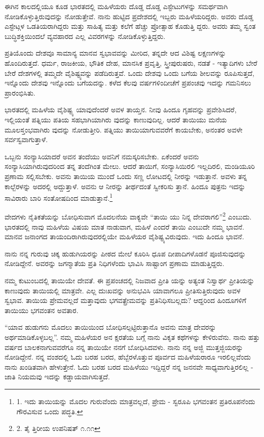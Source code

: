 ಈಗಿನ ಕಾಲದಲ್ಲಿಯೂ ಕೂಡ ಭಾರತದಲ್ಲಿ ಮಹಿಳೆಯರು ದೊಡ್ಡ ದೊಡ್ಡ ಎಸ್ಟೇಟುಗಳನ್ನು ಸಮರ್ಥವಾಗಿ ನೋಡಿಕೊಳ್ಳುತ್ತಿರುವುದನ್ನು ನೋಡುತ್ತೇವೆ. ನಾನು ಹುಟ್ಟಿದ ಪ್ರದೇಶದಲ್ಲಿ ಇಬ್ಬರು ಮಹಿಳೆಯರಿದ್ದರು. ಅವರು ದೊಡ್ಡ ಎಸ್ಟೇಟ್ಗಳ ಒಡತಿಯರಾಗಿದ್ದರು ಮತ್ತು ಸಾಹಿತ್ಯ ಮತ್ತು ಕಲೆಗೆ ಹೆಚ್ಚು ಪ್ರೋತ್ಸಾಹ ಕೊಡುತ್ತಿ ದ್ದರು. ಅವರು ತಮ್ಮ ಸ್ವಂತ ಬುದ್ಧಿಶಕ್ತಿಯಿಂದಲೆ ವ್ಯವಹಾರದ ಎಲ್ಲ ವಿವರಗಳನ್ನು ನೋಡಿಕೊಳ್ಳುತ್ತಿದ್ದರು.

ಪ್ರತಿಯೊಂದು ದೇಶವೂ ಸಾಮಾನ್ಯ ಮಾನವ ಸ್ವಭಾವವನ್ನು ಮೀರಿದ, ತನ್ನದೇ ಆದ ವಿಶಿಷ್ಟ ಲಕ್ಷಣಗಳನ್ನು ಹೊಂದಿರುತ್ತದೆ. ಧರ್ಮ, ರಾಜಕೀಯ, ಭೌತಿಕ ದೇಹ, ಮಾನಸಿಕ ಪ್ರವೃತ್ತಿ, ಸ್ತ್ರೀಪುರುಷರು, ನಡತೆ - ಇತ್ಯಾದಿಗಳು ಬೇರೆ ಬೇರೆ ದೇಶಗಳಲ್ಲಿ ತಮ್ಮದೇ ವೈಶಿಷ್ಟ್ಯವನ್ನು ಪಡೆದಿರುತ್ತವೆ. ಒಂದು ದೇಶವು ಒಂದು ಬಗೆಯ ಶೀಲವನ್ನು ರೂಪಿಸುತ್ತದೆ, ಇನ್ನೊಂದು ದೇಶವು ಇನ್ನೊಂದು ಬಗೆಯದನ್ನು. ಕಳೆದ ಕೆಲವು ವರ್ಷಗಳಿಂದೀಚೆಗೆ ಪ್ರಪಂಚವು ಇದನ್ನು ಗಮನಿಸಲು ಪ್ರಾರಂಭಿಸಿತು.

ಭಾರತದಲ್ಲಿ ಮಹಿಳೆಯ ವೈಶಿಷ್ಟ್ಯ ಯಾವುದೆಂದರೆ ಅವಳ ತಾಯ್ತನ. ನೀವು ಹಿಂದೂ ಗೃಹವನ್ನು ಪ್ರವೇಶಿಸಿದರೆ, ಇಲ್ಲಿಯಂತೆ ಪತ್ನಿಯು ಪತಿಯ ಸಹಭಾಗಿಯಾಗಿರು ವುದನ್ನು ಕಾಣುವುದಿಲ್ಲ. ಆದರೆ ತಾಯಿಯು ಮನೆಯ ಮೂಲಸ್ತಂಭವಾಗಿರು ವುದನ್ನು ನೋಡುತ್ತೀರಿ. ಪತ್ನಿಯು ತಾಯಿಯಾಗುವವರೆಗೆ ಕಾಯಬೇಕು, ಅನಂತರ ಅವಳೇ ಸರ್ವಸ್ವವಾಗುತ್ತಾಳೆ.

ಒಬ್ಬನು ಸಂನ್ಯಾಸಿಯಾದರೆ ಅವನ ತಂದೆಯು ಅವನಿಗೆ ನಮಸ್ಕರಿಸಬೇಕು. ಏಕೆಂದರೆ ಅವನು ಸಂನ್ಯಾಸಿಯಾಗಿರುವುದರಿಂದ ತನ್ನ ತಂದೆಗಿಂತ ಮೇಲು. ಆದರೆ ತಾಯಿಗೆ, ಸಂನ್ಯಾಸಿಯಿರಲಿ ಇಲ್ಲದಿರಲಿ, ಮಂಡಿಯೂರಿ ಪ್ರಣಾಮ ಸಲ್ಲಿಸಬೇಕು. ಅವನು ತಾಯಿಯ ಮುಂದೆ ಒಂದು ಸಣ್ಣ ಲೋಟದಲ್ಲಿ ನೀರನ್ನು ಇಡುತ್ತಾನೆ. ಅವಳು ತನ್ನ ಕಾಲ್ಬೆರಳನ್ನು ಅದರಲ್ಲಿ ಅದ್ದುತ್ತಾಳೆ. ಅವನು ಆ ನೀರನ್ನು ತೀರ್ಥದಂತೆ ಸ್ವೀಕರಿಸು ತ್ತಾನೆ. ಹಿಂದೂ ಪುತ್ರನು ಇದನ್ನು ಸಾವಿರಾರು ಬಾರಿ ಸಂತೋಷದಿಂದ ಮಾಡುತ್ತಾನೆ.\footnote{1. ಇದು ತಾಯಿಯನ್ನು ಮೊದಲ ಗುರುವೆಂದು ಮಾತ್ರವಲ್ಲದೆ, ಪ್ರೇಮ - ಸ್ವರೂಪಿ ಭಗವಂತನ ಪ್ರತಿರೂಪನೆಂದು ಗೌರವಿಸುವ ಒಂದು ಪದ್ಧತಿ.}

ವೇದಗಳು ನೈತಿಕತೆಯನ್ನು ಬೋಧಿಸುವಾಗ ಮೊದಲನೆಯ ವಾಕ್ಯವೇ “ತಾಯಿ ಯು ನಿನ್ನ ದೇವರಾಗಲಿ”\footnote{2. ತೈ ತ್ತಿರೀಯ ಉಪನಿಷತ್ ೧.೧೧} ಎಂಬುದು. ಭಾರತದಲ್ಲಿ ನಾವು ಮಹಿಳೆಯ ವಿಷಯ ಮಾತ ನಾಡುವಾಗ, ಮಹಿಳೆ ಎಂದರೆ ತಾಯಿ ಎಂಬುದೇ ನಮ್ಮ ಭಾವನೆ. ಮಾನವ ಜನಾಂಗದ ತಾಯಂದಿರಾಗಿರುವುದರಲ್ಲಿಯೇ ಮಹಿಳೆಯರ ವೈಶಿಷ್ಟ್ಯವಿರುವುದು. ಇದು ಹಿಂದೂ ಭಾವನೆ.

ನಾನು ನನ್ನ ಗುರುವು ಚಿಕ್ಕ ಹುಡುಗಿಯರನ್ನು ಪೀಠದ ಮೇಲೆ ಕೂರಿಸಿ ಧೂಪ ದೀಪಾದಿಗಳೊಡನೆ ಪೂಜಿಸುವುದನ್ನು ನೋಡಿದ್ದೇನೆ. ಅವರನ್ನು ಜಗನ್ಮಾತೆಯ ಪ್ರತಿ ನಿಧಿಗಳೆಂದು ಭಾವಿಸಿ ಸಾಷ್ಟಾಂಗ ಪ್ರಣಾಮ ಮಾಡುತ್ತಿದ್ದರು.

ನಮ್ಮ ಕುಟುಂಬದಲ್ಲಿ ತಾಯಿಯೇ ದೇವತೆ. ಈ ಪ್ರಪಂಚದಲ್ಲಿ ನಿಜವಾದ ಪ್ರೀತಿ ಯನ್ನು ಅತ್ಯಂತ ನಿಸ್ವಾರ್ಥ ಪ್ರೀತಿಯನ್ನು ಕಾಣುವುದು ತಾಯಿಯಲ್ಲಿ ಮಾತ್ರವೇ. ಎಲ್ಲ ದುಃಖವನ್ನು ಅನುಭವಿಸಿ ಯಾವಾಗಲೂ ಪ್ರೀತಿಸುತ್ತಿರುವುದು ಅವಳ ಸ್ವಭಾವ. ತಾಯಿಯ ಪ್ರೇಮವಲ್ಲದೆ ಮತ್ತಾವುದು ಭಗವತ್ಪ್ರೇಮವನ್ನು ಪ್ರತಿನಿಧಿಸಬಲ್ಲದು? ಆದ್ದರಿಂದ ಹಿಂದೂಗಳಿಗೆ ತಾಯಿಯು ಭಗವಂತನ ಅವತಾರ.

“ಯಾವ ಹುಡುಗನು ಮೊದಲು ತಾಯಿಯಿಂದ ಬೋಧಿಸಲ್ಪಟ್ಟಿರುತ್ತಾನೊ ಅವನು ಮಾತ್ರ ದೇವರನ್ನು ಅರ್ಥಮಾಡಿಕೊಳ್ಳಬಲ್ಲ”. ನಮ್ಮ ಮಹಿಳೆಯರ ಅನ ಕ್ಷರತೆಯ ಬಗ್ಗೆ ನಾನು ವಿಕೃತ ಕಥೆಗಳನ್ನು ಕೇಳಿರುವೆನು. ನಾನು ಹತ್ತು ವರ್ಷದ ಬಾಲಕನಾಗುವವರೆಗೂ ನನ್ನ ತಾಯಿಯೇ ನನಗೆ ಬೋಧಿಸಿದವಳು. ನಾನು ನನ್ನ ಅಜ್ಜಿ ಮುತ್ತಜ್ಜಿಯರನ್ನು ನೋಡಿದ್ದೇನೆ. ನನ್ನ ವಂಶದಲ್ಲಿ ಓದು ಬರಹ ಬರದ, ಹೆಬ್ಬೆರಳೊತ್ತುವ ಪೂರ್ವದ ಮಹಿಳೆಯರಾರೂ ಇರಲಿಲ್ಲವೆಂದು ನಾನು ಖಂಡಿತವಾಗಿ ಹೇಳುತ್ತೇನೆ. ಓದು ಬರಹ ಬರದ ಮಹಿಳೆಯು ಇದ್ದಿದ್ದರೆ ನನ್ನ ಜನನವೇ ಸಾಧ್ಯವಾಗುತ್ತಿರಲಿಲ್ಲ - ಜಾತಿ ನಿಯಮವು ಇದನ್ನು ಕಡ್ಡಾಯವಾಗಿಸುತ್ತದೆ.

